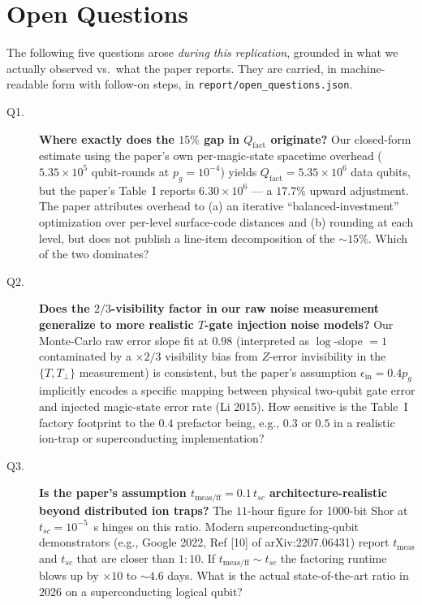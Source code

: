 \section*{Open Questions}

The following five questions arose \emph{during this replication}, grounded
in what we actually observed vs.\ what the paper reports. They are
carried, in machine-readable form with follow-on steps, in
\texttt{report/open\_questions.json}.

\begin{description}

\item[Q1.] \textbf{Where exactly does the $15\%$ gap in $Q_{\text{fact}}$
originate?} Our closed-form estimate using the paper's own per-magic-state
spacetime overhead ($5.35\times 10^{5}$ qubit-rounds at $p_g=10^{-4}$)
yields $Q_{\text{fact}}=5.35\times 10^{6}$ data qubits, but the paper's
Table~I reports $6.30\times 10^{6}$ --- a $17.7\%$ upward adjustment.
The paper attributes overhead to (a) an iterative
``balanced-investment'' optimization over per-level surface-code
distances and (b) rounding at each level, but does not publish a line-item
decomposition of the $\sim 15\%$. Which of the two dominates?

\item[Q2.] \textbf{Does the $2/3$-visibility factor in our raw noise
measurement generalize to more realistic $T$-gate injection noise
models?} Our Monte-Carlo raw error slope fit at $0.98$ (interpreted as
$\log$-slope $=1$ contaminated by a $\times 2/3$ visibility bias from
$Z$-error invisibility in the $\{T,T_\perp\}$ measurement) is
consistent, but the paper's assumption $\epsilon_{\text{in}}=0.4 p_g$
implicitly encodes a specific mapping between physical two-qubit gate
error and injected magic-state error rate (Li 2015). How sensitive is
the Table~I factory footprint to the $0.4$ prefactor being, e.g., $0.3$
or $0.5$ in a realistic ion-trap or superconducting implementation?

\item[Q3.] \textbf{Is the paper's assumption $t_{\text{meas/ff}} = 0.1\,t_{sc}$
architecture-realistic beyond distributed ion traps?} The
$11$-hour figure for 1000-bit Shor at $t_{sc}=10^{-5}$~s hinges on
this ratio. Modern superconducting-qubit demonstrators (e.g., Google
2022, Ref [10] of arXiv:2207.06431) report $t_{\text{meas}}$ and $t_{sc}$
that are closer than $1:10$. If $t_{\text{meas/ff}} \sim t_{sc}$ the
factoring runtime blows up by $\times 10$ to $\sim 4.6$ days. What is
the actual state-of-the-art ratio in 2026 on a superconducting logical
qubit?


\end{description}
